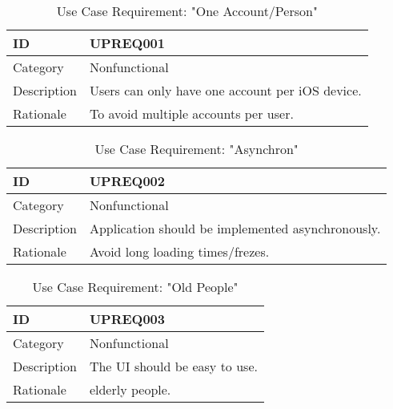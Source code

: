 \begin{comment}
\vspace{5mm}
    
\begin{tabular}{ |p{2cm}||p{9cm}| }
    \hline
    ID & \textbf{PREQ000}\\ \hline
    Category & performance \\ \hline
    Description & 

    \\ \hline
    Rationale &  \\ \hline 
    Source &  \\ \hline
\end{tabular}  
\end{comment}

\begin{flushleft}

\vspace{5mm}
\begin{table}[H]
    \begin{tabular}{ |p{2cm}||p{9cm}| }
        \hline
        ID & \textbf{UPREQ001}\\ \hline
        Category & Nonfunctional \\ \hline
        Description & 
        Users can only have one account per iOS device.
        \\ \hline
        Rationale & To avoid multiple accounts per user. \\ \hline 
    \end{tabular} 
\caption{Use Case Requirement: "One Account/Person"}
\end{table}

\vspace{5mm}
\begin{table}[H]
    \begin{tabular}{ |p{2cm}||p{9cm}| }
        \hline
        ID & \textbf{UPREQ002}\\ \hline
        Category & Nonfunctional \\ \hline
        Description & 
        Application should be implemented asynchronously.
        \\ \hline
        Rationale & Avoid long loading times/frezes. \\ \hline 
    \end{tabular} 
\caption{Use Case Requirement: "Asynchron"}
\end{table}

\vspace{5mm}
\begin{table}[H]
    \begin{tabular}{ |p{2cm}||p{9cm}| }
        \hline
        ID & \textbf{UPREQ003}\\ \hline
        Category & Nonfunctional \\ \hline
        Description & 
        The UI should be easy to use.
        \\ \hline
        Rationale & elderly people. \\ \hline 
    \end{tabular} 
\caption{Use Case Requirement: "Old People"}
\end{table}


\end{flushleft}
